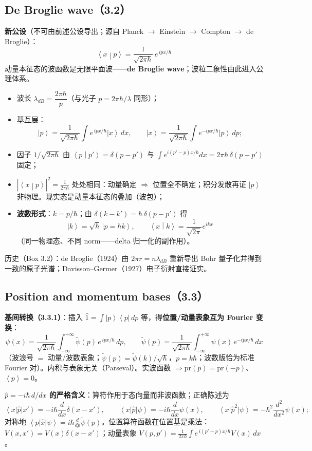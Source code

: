 \documentclass[11pt]{ctexart}
\newcommand{\ket}[1]{\left|#1\right\rangle}
\newcommand{\bra}[1]{\left\langle#1\right|}
\newcommand{\braket}[2]{\left\langle#1\middle|#2\right\rangle}
\newcommand{\ev}[1]{\left\langle#1\right\rangle}
\newcommand{\op}[1]{\hat{#1}}
\begin{document}
\subsection{De Broglie wave（3.2）}

\textbf{新公设}（不可由前述公设导出；源自 Planck $\to$ Einstein $\to$ Compton $\to$ de Broglie）：
\[
\boxed{\;\braket xp=\frac{1}{\sqrt{2\pi\hbar}}\,e^{\,ipx/\hbar}\;}
\]
动量本征态的波函数是无限平面波——\textbf{de Broglie wave}；波粒二象性由此进入公理体系。
\begin{itemize}
\item 波长 $\lambda_{dB}=\dfrac{2\pi\hbar}{p}$（与光子 $p=2\pi\hbar/\lambda$ 同形）；
\item 基互展：
\[
\ket p=\frac{1}{\sqrt{2\pi\hbar}}\int e^{\,ipx/\hbar}\ket x\,dx,\qquad
\ket x=\frac{1}{\sqrt{2\pi\hbar}}\int e^{-ipx/\hbar}\ket p\,dp;
\]
\item 因子 $1/\sqrt{2\pi\hbar}$ 由 $\braket p{p'}=\delta(p-p')$ 与 $\int e^{i(p'-p)x/\hbar}dx=2\pi\hbar\,\delta(p-p')$ 固定；
\item $|\braket xp|^2=\frac{1}{2\pi\hbar}$ 处处相同：动量确定 $\Rightarrow$ 位置全不确定；积分发散再证 $\ket p$ 非物理。现实态是动量本征态的叠加（波包）；
\item \textbf{波数形式}：$k=p/\hbar$；由 $\delta(k-k')=\hbar\,\delta(p-p')$ 得
\[
\ket k=\sqrt\hbar\,\ket{p=\hbar k},\qquad \braket xk=\frac{1}{\sqrt{2\pi}}e^{ikx}
\]
（同一物理态、不同 norm——delta 归一化的副作用）。
\end{itemize}
历史（Box 3.2）：de Broglie（1924）由 $2\pi r=n\lambda_{dB}$ 重新导出 Bohr 量子化并得到一致的原子光谱；Davisson--Germer（1927）电子衍射直接证实。

\subsection{Position and momentum bases（3.3）}

\textbf{基间转换（3.3.1）}：插入 $\op1=\int\ket p\bra p\,dp$ 等，得\textbf{位置/动量表象互为 Fourier 变换}：
\[
\psi(x)=\frac{1}{\sqrt{2\pi\hbar}}\int_{-\infty}^{+\infty}\tilde\psi(p)\,e^{\,ipx/\hbar}\,dp,\qquad
\tilde\psi(p)=\frac{1}{\sqrt{2\pi\hbar}}\int_{-\infty}^{+\infty}\psi(x)\,e^{-ipx/\hbar}\,dx
\]
（波浪号 $=$ 动量/波数表象；$\tilde\psi(p)=\tilde\psi(k)/\sqrt\hbar$，$p=k\hbar$；波数版恰为标准 Fourier 对）。内积与表象无关（Parseval）。实波函数 $\Rightarrow\mathrm{pr}(p)=\mathrm{pr}(-p)$、$\ev p=0$。

\textbf{$\op p=-i\hbar\,d/dx$ 的严格含义}：算符作用于态向量而非波函数；正确陈述为
\[
\bra x\op p\ket{x'}=-i\hbar\frac{d}{dx}\delta(x-x'),\qquad
\bra x\op p\ket\psi=-i\hbar\frac{d}{dx}\psi(x),\qquad
\bra x\op p^2\ket\psi=-\hbar^2\frac{d^2}{dx^2}\psi(x);
\]
对称地 $\bra p\op x\ket\psi=i\hbar\frac{d}{dp}\tilde\psi(p)$。位置算符函数在位置基是乘法：$V(x,x')=V(x)\delta(x-x')$；动量表象 $V(p,p')=\frac{1}{2\pi\hbar}\int e^{\,i(p'-p)x/\hbar}V(x)\,dx$。
\end{document}
